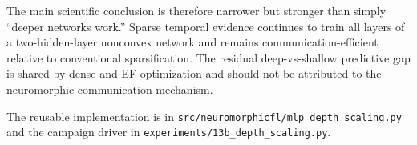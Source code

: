 The main scientific conclusion is therefore narrower but stronger than simply ``deeper networks work.'' Sparse temporal evidence continues to train all layers of a two-hidden-layer nonconvex network and remains communication-efficient relative to conventional sparsification. The residual deep-vs-shallow predictive gap is shared by dense and EF optimization and should not be attributed to the neuromorphic communication mechanism.

The reusable implementation is in \texttt{src/neuromorphicfl/mlp\_depth\_scaling.py} and the campaign driver in \texttt{experiments/13b\_depth\_scaling.py}.

